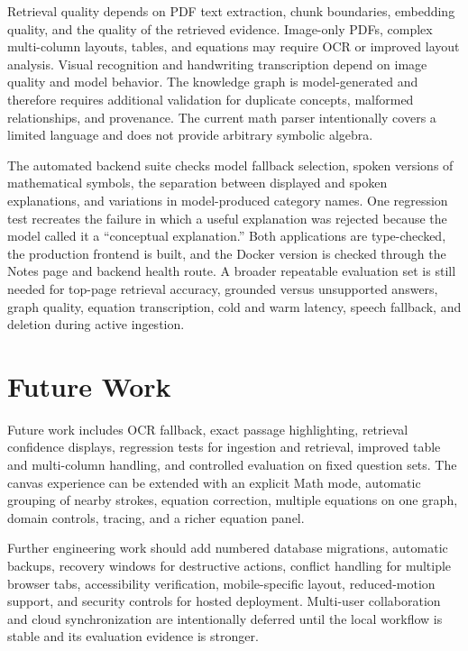 \documentclass[conference]{IEEEtran}
\begin{document}
Retrieval quality depends on PDF text extraction, chunk boundaries, embedding quality, and the quality of the retrieved evidence. Image-only PDFs, complex multi-column layouts, tables, and equations may require OCR or improved layout analysis. Visual recognition and handwriting transcription depend on image quality and model behavior. The knowledge graph is model-generated and therefore requires additional validation for duplicate concepts, malformed relationships, and provenance. The current math parser intentionally covers a limited language and does not provide arbitrary symbolic algebra.

The automated backend suite checks model fallback selection, spoken versions of mathematical symbols, the separation between displayed and spoken explanations, and variations in model-produced category names. One regression test recreates the failure in which a useful explanation was rejected because the model called it a ``conceptual explanation.'' Both applications are type-checked, the production frontend is built, and the Docker version is checked through the Notes page and backend health route. A broader repeatable evaluation set is still needed for top-page retrieval accuracy, grounded versus unsupported answers, graph quality, equation transcription, cold and warm latency, speech fallback, and deletion during active ingestion.

\section{Future Work}
Future work includes OCR fallback, exact passage highlighting, retrieval confidence displays, regression tests for ingestion and retrieval, improved table and multi-column handling, and controlled evaluation on fixed question sets. The canvas experience can be extended with an explicit Math mode, automatic grouping of nearby strokes, equation correction, multiple equations on one graph, domain controls, tracing, and a richer equation panel.

Further engineering work should add numbered database migrations, automatic backups, recovery windows for destructive actions, conflict handling for multiple browser tabs, accessibility verification, mobile-specific layout, reduced-motion support, and security controls for hosted deployment. Multi-user collaboration and cloud synchronization are intentionally deferred until the local workflow is stable and its evaluation evidence is stronger.
\end{document}
